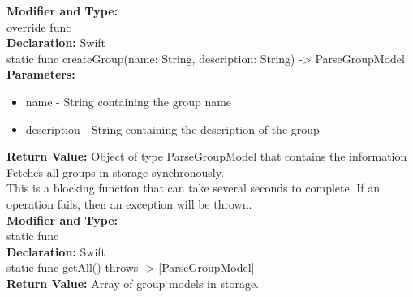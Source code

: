 {{{{{{\textbf{Modifier and Type:}\\
\taboverride override func\\


\textbf{Declaration:}
\tab 
Swift\\

static func createGroup(name: String, description: String) -> ParseGroupModel\\

\textbf{Parameters:}
\begin{itemize}
\item name - String containing the group name
\item description - String containing the description of the group
\end{itemize}

\textbf{Return Value:}
Object of type ParseGroupModel that contains the information\\

\hypertarget{class_ParseGroupModel.iOS.getAll}{
\label{ParseGroupModel.iOS.getAll}
Fetches all groups in storage synchronously.\\

This is a blocking function that can take several seconds to complete. If an operation fails, then an exception will be thrown.\\

\textbf{Modifier and Type:}\\
\taboverride static func\\


\textbf{Declaration:}
\tab 
Swift\\

static func getAll() throws -> [ParseGroupModel]\\


\textbf{Return Value:}
Array of group models in storage. \\

}}}}}}}
